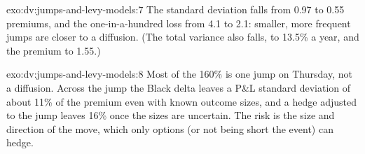 \begin{solution}{exo:dv:jumps-and-levy-models:7}
The standard deviation falls from 0.97 to 0.55 premiums, and the one-in-a-hundred loss from 4.1 to 2.1: smaller,
more frequent jumps are closer to a diffusion. (The total variance also falls, to 13.5\% a year, and the premium
to 1.55.)
\end{solution}

\begin{solution}{exo:dv:jumps-and-levy-models:8}
Most of the 160\% is one jump on Thursday, not a diffusion. Across the jump the Black delta leaves a P\&L standard
deviation of about 11\% of the premium even with known outcome sizes, and a hedge adjusted to the jump leaves 16\%
once the sizes are uncertain. The risk is the size and direction of the move, which only options (or not being
short the event) can hedge.
\end{solution}

